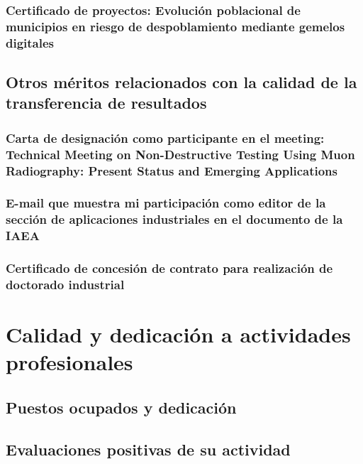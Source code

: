 \documentclass[a4paper, 11pt, twoside, openright]{report}
\begin{document}
\subsubsection{Certificado de proyectos: Evolución poblacional de municipios en riesgo de despoblamiento mediante gemelos digitales}




\subsection{Otros méritos relacionados con la calidad de la transferencia de resultados}

\subsubsection{Carta de designación como participante en el meeting: Technical Meeting on Non-Destructive Testing Using Muon Radiography: Present Status and Emerging Applications}


\subsubsection{E-mail que muestra mi participación como editor de la sección de aplicaciones industriales en el documento de la IAEA}


\subsubsection{Certificado de concesión de contrato para realización de doctorado industrial}



\section{Calidad y dedicación a actividades profesionales}

\subsection{Puestos ocupados y dedicación}

\subsection{Evaluaciones positivas de su actividad}
\end{document}
